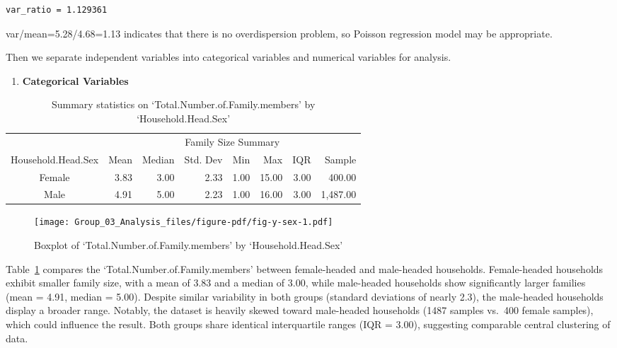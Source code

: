 \documentclass[
]{article}
\providecommand{\tightlist}{%
  \setlength{\itemsep}{0pt}\setlength{\parskip}{0pt}}\usepackage{longtable,booktabs,array}
\begin{document}
\begin{verbatim}
var_ratio = 1.129361 
\end{verbatim}

var/mean=5.28/4.68=1.13 indicates that there is no overdispersion
problem, so Poisson regression model may be appropriate.

Then we separate independent variables into categorical variables and
numerical variables for analysis.

\begin{enumerate}
\def\labelenumi{\arabic{enumi}.}
\tightlist
\item
  \textbf{Categorical Variables}
\end{enumerate}

\hypertarget{tbl-y-sex}{}
\begin{table}
\caption{\label{tbl-y-sex}Summary statistics on `Total.Number.of.Family.members' by
`Household.Head.Sex' }\tabularnewline

\fontsize{9.0pt}{10.8pt}\selectfont
\begin{tabular*}{0.9\linewidth}{@{\extracolsep{\fill}}crrrrrrr}
\toprule
 & \multicolumn{7}{c}{Family Size Summary} \\ 
\cmidrule(lr){2-8}
Household.Head.Sex & Mean & Median & Std. Dev & Min & Max & IQR & Sample \\ 
\midrule\addlinespace[2.5pt]
Female & 3.83 & 3.00 & 2.33 & 1.00 & 15.00 & 3.00 & 400.00 \\ 
Male & 4.91 & 5.00 & 2.23 & 1.00 & 16.00 & 3.00 & 1,487.00 \\ 
\bottomrule
\end{tabular*}
\end{table}

\begin{figure}[H]

{\centering \texttt{[image: Group\_03\_Analysis\_files/figure-pdf/fig-y-sex-1.pdf]}

}

\caption{\label{fig-y-sex}Boxplot of `Total.Number.of.Family.members' by
`Household.Head.Sex'}

\end{figure}

Table~\ref{tbl-y-sex} compares the `Total.Number.of.Family.members'
between female-headed and male-headed households. Female-headed
households exhibit smaller family size, with a mean of 3.83 and a median
of 3.00, while male-headed households show significantly larger families
(mean = 4.91, median = 5.00). Despite similar variability in both groups
(standard deviations of nearly 2.3), the male-headed households display
a broader range. Notably, the dataset is heavily skewed toward
male-headed households (1487 samples vs.~400 female samples), which
could influence the result. Both groups share identical interquartile
ranges (IQR = 3.00), suggesting comparable central clustering of data.
\end{document}
